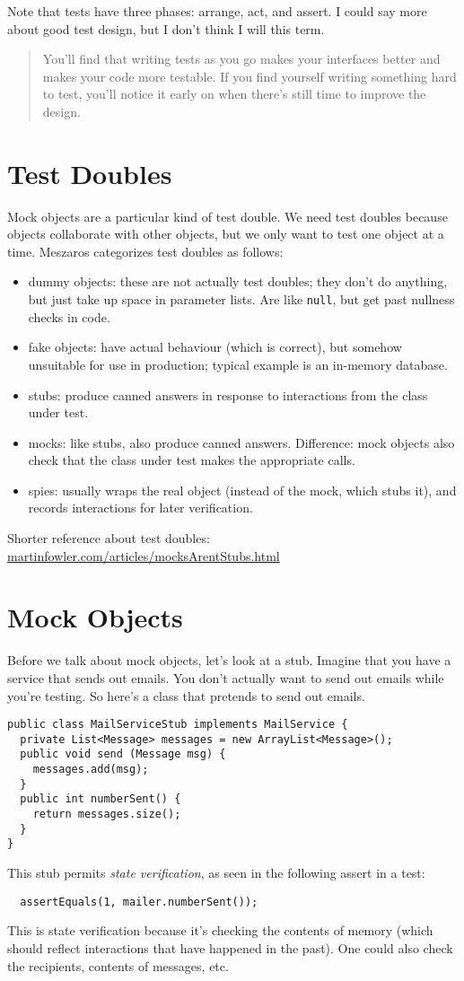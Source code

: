 \documentclass[11pt]{article}
\begin{document}
Note that tests have three phases: arrange, act, and assert. I could say more about good test design, but I don't think I will this term.

\begin{quote}
You'll find that writing tests as you go makes your interfaces better and makes your code more testable. If you find yourself writing something hard to test, you'll notice it early on when there's still time to improve the design.
\end{quote}

\section*{Test Doubles}
Mock objects are a particular kind of test double. We need test doubles
because objects collaborate with other objects, but we only want to test
one object at a time.
Meszaros categorizes test doubles as follows:
\begin{itemize}[noitemsep]
    \item dummy objects: these are not actually test doubles; they don't do anything, but just take up space in parameter lists. Are like {\tt null}, but get past nullness checks in code.
    \item fake objects: have actual behaviour (which is correct), but somehow unsuitable for use in production; typical example is an in-memory database.
    \item stubs: produce canned answers in response to interactions from the class under test.
    \item mocks: like stubs, also produce canned answers. Difference: mock objects also check that the class under test makes the appropriate calls.
    \item spies: usually wraps the real object (instead of the mock, which stubs it), and records interactions for later verification.
\end{itemize}
Shorter reference about test doubles: \url{martinfowler.com/articles/mocksArentStubs.html}

\section*{Mock Objects}
Before we talk about mock objects, let's look at a stub. Imagine that you have a service that
sends out emails. You don't actually want to send out emails while you're testing. So here's
a class that pretends to send out emails.
\begin{lstlisting}
public class MailServiceStub implements MailService {
  private List<Message> messages = new ArrayList<Message>();
  public void send (Message msg) {
    messages.add(msg);
  }
  public int numberSent() {
    return messages.size();
  }
}     
\end{lstlisting}
This stub permits \emph{state verification}, as seen in the following assert in a test:
\begin{lstlisting}
  assertEquals(1, mailer.numberSent());
\end{lstlisting}
This is state verification because it's checking the contents of
memory (which should reflect interactions that have happened in the
past). One could also check the recipients, contents of messages, etc.
\end{document}
